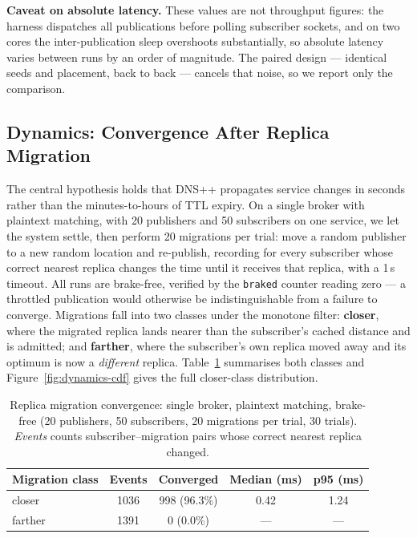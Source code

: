 \documentclass[10pt]{article}
\begin{document}
\textbf{Caveat on absolute latency.} These values are not throughput figures: the harness dispatches all publications before polling subscriber sockets, and on two cores the inter-publication sleep overshoots substantially, so absolute latency varies between runs by an order of magnitude. The paired design --- identical seeds and placement, back to back --- cancels that noise, so we report only the comparison.

\subsection{Dynamics: Convergence After Replica Migration}
\label{sec:dynamics}

The central hypothesis holds that DNS++ propagates service changes in seconds rather than the minutes-to-hours of TTL expiry. On a single broker with plaintext matching, with 20 publishers and 50 subscribers on one service, we let the system settle, then perform 20 migrations per trial: move a random publisher to a new random location and re-publish, recording for every subscriber whose correct nearest replica changes the time until it receives that replica, with a 1\,s timeout. All runs are brake-free, verified by the \texttt{braked} counter reading zero --- a throttled publication would otherwise be indistinguishable from a failure to converge. Migrations fall into two classes under the monotone filter: \textbf{closer}, where the migrated replica lands nearer than the subscriber's cached distance and is admitted; and \textbf{farther}, where the subscriber's own replica moved away and its optimum is now a \emph{different} replica. Table~\ref{tab:dynamics} summarises both classes and Figure~\ref{fig:dynamics-cdf} gives the full closer-class distribution.

\begin{table}[t]
\centering
\caption{Replica migration convergence: single broker, plaintext matching, brake-free (20 publishers, 50 subscribers, 20 migrations per trial, 30 trials). \emph{Events} counts subscriber--migration pairs whose correct nearest replica changed.}
\label{tab:dynamics}
\begin{tabular}{lcccc}
\toprule
Migration class & Events & Converged & Median (ms) & p95 (ms) \\
\midrule
closer  & 1036 & 998 (96.3\%) & 0.42 & 1.24 \\
farther & 1391 & 0 (0.0\%)    & ---  & ---  \\
\bottomrule
\end{tabular}
\end{table}
\end{document}
